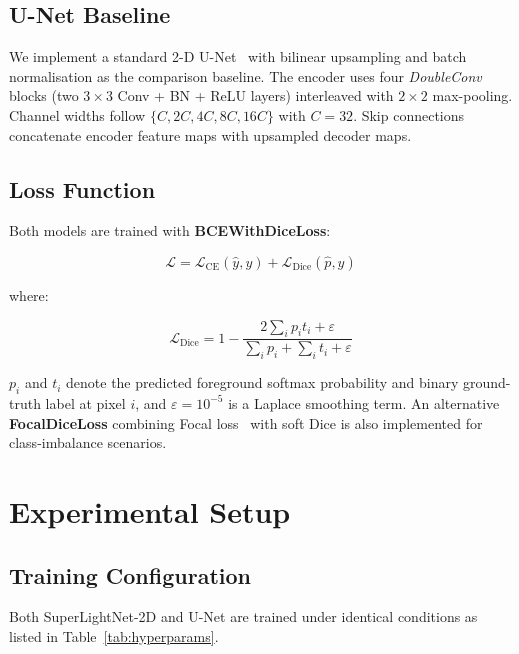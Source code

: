 \documentclass[conference]{IEEEtran}
\begin{document}
\subsection{U-Net Baseline}

We implement a standard 2-D U-Net~\cite{ronneberger2015u} with
bilinear upsampling and batch normalisation as the comparison
baseline. The encoder uses four \textit{DoubleConv} blocks (two
$3{\times}3$ Conv + BN + ReLU layers) interleaved with $2{\times}2$
max-pooling. Channel widths follow $\{C, 2C, 4C, 8C, 16C\}$ with
$C{=}32$. Skip connections concatenate encoder feature maps with
upsampled decoder maps.

\subsection{Loss Function}

Both models are trained with \textbf{BCEWithDiceLoss}:

\begin{equation}
  \mathcal{L} = \mathcal{L}_\text{CE}(\hat{y}, y)
              + \mathcal{L}_\text{Dice}(\hat{p}, y)
\end{equation}

where:

\begin{equation}
  \mathcal{L}_\text{Dice} = 1 - \frac{2\sum_i p_i t_i + \varepsilon}
                                      {\sum_i p_i + \sum_i t_i + \varepsilon}
\end{equation}

$p_i$ and $t_i$ denote the predicted foreground softmax probability
and binary ground-truth label at pixel $i$, and $\varepsilon{=}10^{-5}$
is a Laplace smoothing term. An alternative \textbf{FocalDiceLoss}
combining Focal loss~\cite{lin2017focal} with soft Dice is also
implemented for class-imbalance scenarios.

\section{Experimental Setup}

\subsection{Training Configuration}

Both SuperLightNet-2D and U-Net are trained under identical conditions
as listed in Table~\ref{tab:hyperparams}.
\end{document}
